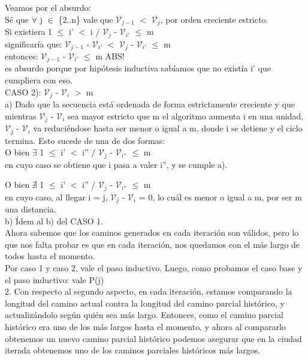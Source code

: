 \documentclass{article}
\theoremstyle{definition}
\theoremstyle{remark}
\begin{document}
Veamos por el absurdo: \\
Sé que $\forall$ j $\in$ \{2..n\} vale que $\mathcal{V}_{j-1}$ $<$ $\mathcal{V}_j$, por orden creciente estricto. \\
Si existiera 1 $\leq$ i' $<$ i $/$ $\mathcal{V}_j$ - $\mathcal{V}_{i'}$ $\leq$ m \\
significaría que:  $\mathcal{V}_{j-1}$ - $\mathcal{V}_{i'}$ $<$ $\mathcal{V}_j$ - $\mathcal{V}_{i'}$ $\leq$ m \\
entonces: $\mathcal{V}_{j-1}$ - $\mathcal{V}_{i'}$ $\leq$ m   ABS! \\
es absurdo porque por hipótesis inductiva sabíamos que no existía i' que cumpliera con eso. \\

CASO 2): $\mathcal{V}_j$ - $\mathcal{V}_i$ $>$ m \\
a) Dado que la secuencia está ordenada de forma estrictamente creciente y que mientras $\mathcal{V}_j$ - $\mathcal{V}_i$ sea mayor estricto que m el algoritmo aumenta i en una unidad, $\mathcal{V}_j$ - $\mathcal{V}_i$ va reduciéndose hasta ser menor o igual a m, donde i se detiene y el ciclo termina. Esto sucede de una de dos formas: \\

O bien $\exists$ 1 $\leq$ i' $<$ i'' $/$ $\mathcal{V}_j$ - $\mathcal{V}_{i''}$ $\leq$ m \\
en cuyo caso se obtiene que i pasa a valer i'', y se cumple a).

O bien $\nexists$ 1 $\leq$ i' $<$ i'' $/$ $\mathcal{V}_j$ - $\mathcal{V}_{i''}$ $\leq$ m \\
en cuyo caso, al llegar i = j, $\mathcal{V}_j$ - $\mathcal{V}_i$ = 0, lo cuál es menor o igual a m, por ser m una distancia. \\

b) Ídem al b) del CASO 1.\\

Ahora sabemos que los caminos generados en cada iteración son válidos, pero lo que nos falta probar es que en cada iteración, nos quedamos con el más largo de todos hasta el momento. \\

Por caso 1 y caso 2, vale el paso inductivo. Luego, como probamos el caso base y el paso inductivo: vale P(j) \\

2. Con respecto al segundo aspecto, en cada iteración, estamos comparando la longitud del camino actual contra la longitud del camino parcial histórico, y actualizándolo según quién sea más largo. Entonces, como el camino parcial histórico era uno de los más largos hasta el momento, y ahora al compararlo obtenemos un nuevo camino parcial histórico podemos asegurar que en la ciudad iterada obtenemos uno de los caminos parciales históricos más largos. \\
\end{document}
